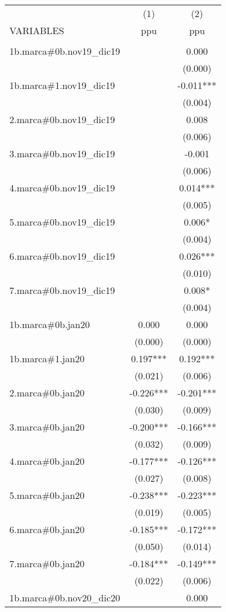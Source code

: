 \begin{tabular}{lcc} \hline
 & (1) & (2) \\
VARIABLES & ppu & ppu \\ \hline
 &  &  \\
1b.marca\#0b.nov19\_dic19 &  & 0.000 \\
 &  & (0.000) \\
1b.marca\#1.nov19\_dic19 &  & -0.011*** \\
 &  & (0.004) \\
2.marca\#0b.nov19\_dic19 &  & 0.008 \\
 &  & (0.006) \\
3.marca\#0b.nov19\_dic19 &  & -0.001 \\
 &  & (0.006) \\
4.marca\#0b.nov19\_dic19 &  & 0.014*** \\
 &  & (0.005) \\
5.marca\#0b.nov19\_dic19 &  & 0.006* \\
 &  & (0.004) \\
6.marca\#0b.nov19\_dic19 &  & 0.026*** \\
 &  & (0.010) \\
7.marca\#0b.nov19\_dic19 &  & 0.008* \\
 &  & (0.004) \\
1b.marca\#0b.jan20 & 0.000 & 0.000 \\
 & (0.000) & (0.000) \\
1b.marca\#1.jan20 & 0.197*** & 0.192*** \\
 & (0.021) & (0.006) \\
2.marca\#0b.jan20 & -0.226*** & -0.201*** \\
 & (0.030) & (0.009) \\
3.marca\#0b.jan20 & -0.200*** & -0.166*** \\
 & (0.032) & (0.009) \\
4.marca\#0b.jan20 & -0.177*** & -0.126*** \\
 & (0.027) & (0.008) \\
5.marca\#0b.jan20 & -0.238*** & -0.223*** \\
 & (0.019) & (0.005) \\
6.marca\#0b.jan20 & -0.185*** & -0.172*** \\
 & (0.050) & (0.014) \\
7.marca\#0b.jan20 & -0.184*** & -0.149*** \\
 & (0.022) & (0.006) \\
1b.marca\#0b.nov20\_dic20 &  & 0.000 \\

\end{tabular}
